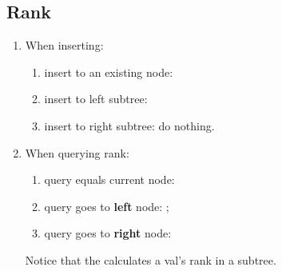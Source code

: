 \subsection{Rank}
\begin{enumerate}
\item When inserting: 
  \begin{enumerate}
  \item insert to an existing node: 
  \item insert to left subtree: 
  \item insert to right subtree: do nothing. 
\end{enumerate}
\item When querying rank:
  \begin{enumerate}
  \item query equals current node: 
  \item query goes to \textbf{left} node: ;
  \item query goes to \textbf{right} node:  
  \end{enumerate}
Notice that the  calculates a val's rank in a subtree.
\end{enumerate}

